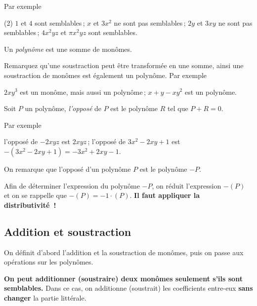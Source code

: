\documentclass[a4paper,12pt]{report}
\begin{document}
Par exemple
\begin{tasks}(2)
	\task $1$ et $4$ sont semblables\,;
	\task $x$ et $3x^2$ ne sont pas semblables\,;
	\task $2y$ et $3xy$ ne sont pas semblables\,;
	\task $4x^2yz$ et $\pi x^2yz$ sont semblables.
\end{tasks}
\begin{defi}[polynôme]
	Un \emph{polynôme} est une somme de monômes. 
\end{defi}
Remarquez qu'une soustraction peut être transformée en une somme, ainsi une soustraction de monômes est également un polynôme. Par exemple
\begin{tasks}
	\task $2xy^3$ est un monôme, mais aussi un polynôme\,;
	\task $x+y-xy^2$ est un polynôme.
\end{tasks}
\begin{defi}[opposé]
Soit $P$ un polynôme, \emph{l'opposé} de $P$ est le polynôme $R$ tel que $P+R=0$.	
\end{defi}
Par exemple
\begin{tasks}
	\task l'opposé de $-2xyz$ est $2xyz$\,;
	\task l'opposé de $3x^2-2xy+1$ est $-(3x^2-2xy+1)=-3x^2+2xy-1$.
\end{tasks}
On remarque que l'opposé d'un polynôme $P$ est le polynôme $-P$. 

\begin{rem}
	Afin de déterminer l'expression du polynôme $-P$, on réduit l'expression $-(P)$ et on se rappelle que $-(P)=-1\cdot (P)$.
	{\bfseries Il faut appliquer la distributivité~!} 
\end{rem}
\subsection{Addition et soustraction}
On définit d'abord l'addition et la soustraction de monômes, puis on passe aux opérations sur les polynômes.

{\bfseries On peut additionner (soustraire) deux monômes seulement s'ils sont semblables.} Dans ce cas, on additionne (soustrait) les coefficients entre-eux {\bfseries sans changer} la partie littérale.
\end{document}
